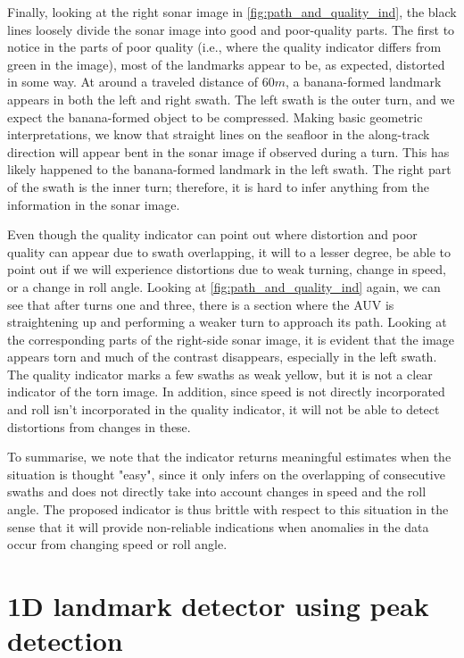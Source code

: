 Finally, looking at the right sonar image in \cref{fig:path_and_quality_ind}, the black lines loosely divide the sonar image into good and poor-quality parts. The first to notice in the parts of poor quality (i.e., where the quality indicator differs from green in the image), most of the landmarks appear to be, as expected, distorted in some way. At around a traveled distance of $60 m$, a banana-formed landmark appears in both the left and right swath. The left swath is the outer turn, and we expect the banana-formed object to be compressed. Making basic geometric interpretations, we know that straight lines on the seafloor in the along-track direction will appear bent in the sonar image if observed during a turn. This has likely happened to the banana-formed landmark in the left swath. The right part of the swath is the inner turn; therefore, it is hard to infer anything from the information in the sonar image.

Even though the quality indicator can point out where distortion and poor quality can appear due to swath overlapping, it will to a lesser degree, be able to point out if we will experience distortions due to weak turning, change in speed, or a change in roll angle. Looking at \cref{fig:path_and_quality_ind} again, we can see that after turns one and three, there is a section where the AUV is straightening up and performing a weaker turn to approach its path. Looking at the corresponding parts of the right-side sonar image, it is evident that the image appears torn and much of the contrast disappears, especially in the left swath. The quality indicator marks a few swaths as weak yellow, but it is not a clear indicator of the torn image. In addition, since speed is not directly incorporated and roll isn't incorporated in the quality indicator, it will not be able to detect distortions from changes in these.

To summarise, we note that the indicator returns meaningful estimates when the situation is thought "easy", since it only infers on the overlapping of consecutive swaths and does not directly take into account changes in speed and the roll angle. The proposed indicator is thus brittle with respect to this situation in the sense that it will provide non-reliable indications when anomalies in the data occur from changing speed or roll angle.  

\section{1D landmark detector using peak detection} \label{sec:disc_1D_landmark_detector}

